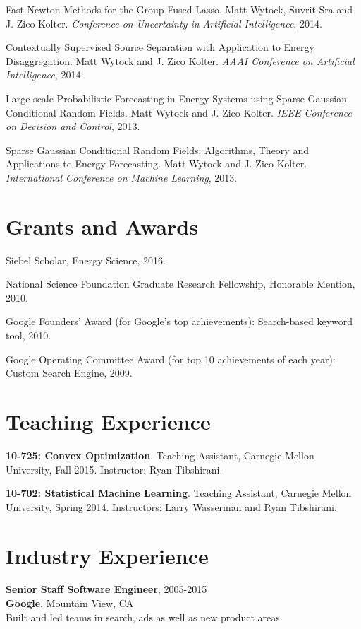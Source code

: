 \documentclass[margin, line]{res}
\begin{document}
\begin{resume}
Fast Newton Methods for the Group Fused Lasso. Matt Wytock, Suvrit Sra and
J. Zico Kolter. \emph{Conference on Uncertainty in Artificial Intelligence}, 2014.

Contextually Supervised Source Separation with Application to Energy
Disaggregation. Matt Wytock and J. Zico Kolter. \emph{AAAI Conference on Artificial
Intelligence}, 2014.

Large-scale Probabilistic Forecasting in Energy Systems using Sparse Gaussian
Conditional Random Fields. Matt Wytock and J. Zico Kolter. \emph{IEEE Conference
on Decision and Control}, 2013.

Sparse Gaussian Conditional Random Fields: Algorithms, Theory and Applications
to Energy Forecasting. Matt Wytock and J. Zico Kolter. \emph{International Conference
on Machine Learning}, 2013.

\section{Grants and Awards}

Siebel Scholar, Energy Science, 2016.

National Science Foundation Graduate Research Fellowship, Honorable Mention,
2010.

Google Founders' Award (for Google's top achievements): Search-based keyword
tool, 2010.

Google Operating Committee Award (for top 10 achievements of each year): Custom Search Engine, 2009.

\section{Teaching Experience}

{\bf 10-725: Convex Optimization}. Teaching Assistant, Carnegie Mellon University, Fall
2015. Instructor: Ryan Tibshirani.

{\bf 10-702: Statistical Machine Learning}. Teaching Assistant, Carnegie
Mellon University, Spring 2014. Instructors: Larry Wasserman and Ryan Tibshirani.

\section{Industry Experience}

{\bf Senior Staff Software Engineer}, 2005-2015 \\
{\bf Google}, Mountain View, CA \\
Built and led teams in search, ads as well as new product areas.


\end{resume}
\end{document}
